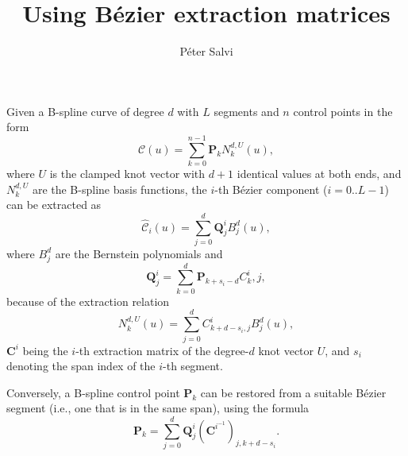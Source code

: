 \documentclass{article}
\begin{document}
\title{Using B\'ezier extraction matrices}
\author{P\'eter Salvi}
\maketitle
Given a B-spline curve of degree $d$ with $L$ segments and $n$ control points in the form
\[\mathcal{C}(u)=\sum_{k=0}^{n-1}\mathbf{P}_kN_k^{d,U}(u),\]
where $U$ is the clamped knot vector with $d+1$ identical values at both ends,
and $N_k^{d,U}$ are the B-spline basis functions, the $i$-th B\'ezier component ($i=0..L-1$)
can be extracted as
\[\hat{\mathcal{C}}_i(u)=\sum_{j=0}^d\mathbf{Q}_j^iB_j^d(u),\]
where $B_j^d$ are the Bernstein polynomials and
\[\mathbf{Q}_j^i=\sum_{k=0}^d\mathbf{P}_{k+s_i-d}C^i_k,j,\]
because of the extraction relation
\[N_k^{d,U}(u)=\sum_{j=0}^dC^i_{k+d-s_i,j}B_j^d(u),\]
$\mathbf{C}^i$ being the $i$-th extraction matrix of the degree-$d$ knot vector $U$,
and $s_i$ denoting the span index of the $i$-th segment.

Conversely, a B-spline control point $\mathbf{P}_k$ can be restored from a
suitable B\'ezier segment (i.e., one that is in the same span), using the formula
\[\mathbf{P}_k=\sum_{j=0}^d\mathbf{Q}_j^i\left(\mathbf{C}^{i^{-1}}\right)_{j,k+d-s_i}.\]
\end{document}
